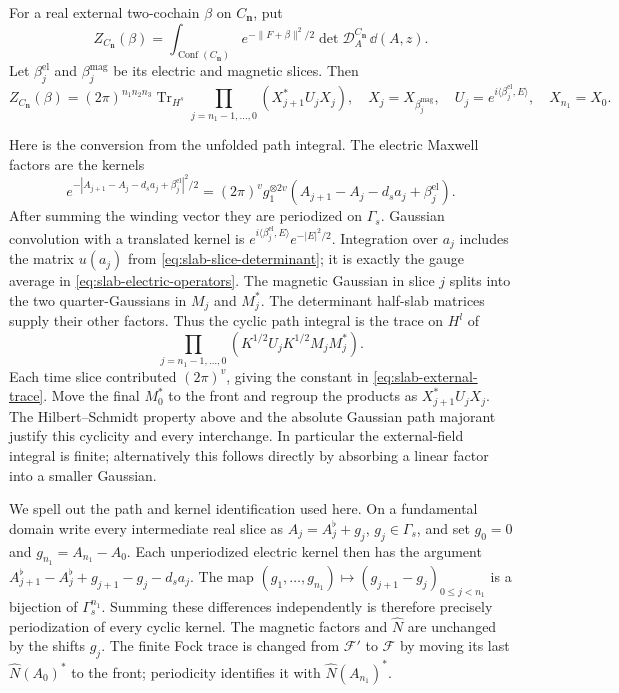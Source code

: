 For a real external two-cochain $\beta$ on $C_{\mathbf n}$, put
\begin{equation}\label{eq:slab-external-partition}
 Z_{C_{\mathbf n}}(\beta)=\int_{\operatorname{Conf}(C_{\mathbf n})}
          e^{-\|F+\beta\|^2/2}\det \mathcal D_A^{C_{\mathbf n}}\,\dd(A,z).
\end{equation}
Let $\beta_j^{\mathrm{el}}$ and $\beta_j^{\mathrm{mag}}$ be its
electric and magnetic slices. Then
\begin{equation}\label{eq:slab-external-trace}
 Z_{C_{\mathbf n}}(\beta)=(2\pi)^{n_1n_2n_3}
       \operatorname{Tr}_{H^s}\prod_{j=n_1-1,\ldots,0}
            (X_{j+1}^*U_jX_j),
 \quad X_j=X_{\beta_j^{\mathrm{mag}}},\quad
 U_j=e^{i\langle\beta_j^{\mathrm{el}},E\rangle},
 \quad X_{n_1}=X_0.
\end{equation}

Here is the conversion from the unfolded path integral. The electric
Maxwell factors are the kernels
\[
 e^{-|A_{j+1}-A_j-d_sa_j+\beta_j^{\mathrm{el}}|^2/2}
       =(2\pi)^v g_1^{\otimes 2v}
                       (A_{j+1}-A_j-d_sa_j+\beta_j^{\mathrm{el}}).
\]
After summing the winding vector they are periodized on $\Gamma_s$.
Gaussian convolution with a translated kernel is
$e^{i\langle\beta_j^{\mathrm{el}},E\rangle}e^{-|E|^2/2}$.
Integration over $a_j$ includes the matrix $u(a_j)$ from
\eqref{eq:slab-slice-determinant}; it is exactly the gauge average in
\eqref{eq:slab-electric-operators}. The magnetic Gaussian in slice
$j$ splits into the two quarter-Gaussians in $M_j$ and $M_j^*$.
The determinant half-slab matrices supply their other factors.
Thus the cyclic path integral is the trace on $H^l$ of
\[
 \prod_{j=n_1-1,\ldots,0}
       (K^{1/2}U_jK^{1/2}M_jM_j^*).
\]
Each time slice contributed $(2\pi)^v$, giving the constant in
\eqref{eq:slab-external-trace}. Move the final $M_0^*$ to the front
and regroup the products as $X_{j+1}^*U_jX_j$. The
Hilbert--Schmidt property above and the absolute Gaussian path
majorant justify this cyclicity and every interchange. In particular
the external-field integral is finite; alternatively this follows
directly by absorbing a linear factor into a smaller Gaussian.

We spell out the path and kernel identification used here. On a
fundamental domain write every intermediate real slice as
$A_j=A_j^\flat+g_j$, $g_j\in\Gamma_s$, and set $g_0=0$ and
$g_{n_1}=A_{n_1}-A_0$. Each unperiodized electric kernel then has
the argument
$A_{j+1}^\flat-A_j^\flat+g_{j+1}-g_j-d_sa_j$.
The map $(g_1,\ldots,g_{n_1})\mapsto
(g_{j+1}-g_j)_{0\le j<n_1}$ is a bijection of $\Gamma_s^{n_1}$.
Summing these differences independently is therefore precisely
periodization of every cyclic kernel. The magnetic factors and
$\widehat N$ are unchanged by the shifts $g_j$. The finite Fock trace
is changed from $\mathcal F'$ to $\mathcal F$ by moving its last
$\widehat N(A_0)^*$ to the front; periodicity identifies it with
$\widehat N(A_{n_1})^*$.

